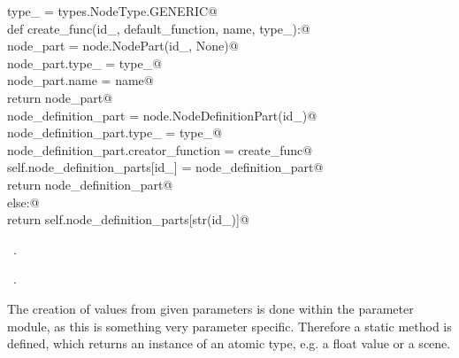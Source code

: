 \documentclass[
    a4paper,      %
    10pt,         %
    openright,    %
    notitlepage,  %
    parskip=half, %
]{scrreprt}       %
\theoremstyle{definition}                    %
\begin{document}
\begin{flushleft}
\begin{minipage}{\linewidth}
\begin{list}{}{}
\mbox{}\lstinline@        type_ = types.NodeType.GENERIC@\\
\mbox{}\lstinline@        def create_func(id_, default_function, name, type_):@\\
\mbox{}\lstinline@            node_part = node.NodePart(id_, None)@\\
\mbox{}\lstinline@            node_part.type_ = type_@\\
\mbox{}\lstinline@            node_part.name = name@\\
\mbox{}\lstinline@            return node_part@\\
\mbox{}\lstinline@        node_definition_part = node.NodeDefinitionPart(id_)@\\
\mbox{}\lstinline@        node_definition_part.type_ = type_@\\
\mbox{}\lstinline@        node_definition_part.creator_function = create_func@\\
\mbox{}\lstinline@        self.node_definition_parts[id_] = node_definition_part@\\
\mbox{}\lstinline@        return node_definition_part@\\
\mbox{}\lstinline@    else:@\\
\mbox{}\lstinline@        return self.node_definition_parts[str(id_)]@\\
\mbox{}\lstinline@@{\NWsep}
\end{list}
\vspace{-1.5ex}
\footnotesize
\begin{list}{}{\setlength{\itemsep}{-\parsep}\setlength{\itemindent}{-\leftmargin}}
\item \NWtxtMacroDefBy\ .
\item \NWtxtMacroRefIn\ .

\item{}
\end{list}
\end{minipage}\vspace{4ex}
\end{flushleft}
The creation of values from given parameters is done within the parameter
module, as this is something very parameter specific. Therefore a static method
is defined, which returns an instance of an atomic type, e.g. a float value or
a scene. 
\end{document}
